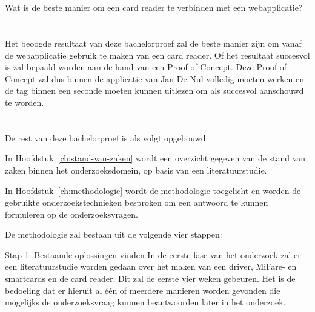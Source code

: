 \section{}%
\label{sec:onderzoeksvraag}
Wat is de beste manier om een card reader te verbinden met een webapplicatie?

\section{}%
\label{sec:onderzoeksdoelstelling}
Het beoogde resultaat van deze bachelorproef zal de beste manier zijn om vanaf de webapplicatie gebruik te maken van een card reader. Of het resultaat succesvol is zal bepaald worden aan de hand van een Proof of Concept. Deze Proof of Concept zal dus binnen de applicatie van Jan De Nul volledig moeten werken en de tag binnen een seconde moeten kunnen uitlezen om als succesvol aanschouwd te worden.


\section{}%
\label{sec:opzet-bachelorproef}


De rest van deze bachelorproef is als volgt opgebouwd:

In Hoofdstuk~\ref{ch:stand-van-zaken} wordt een overzicht gegeven van de stand van zaken binnen het onderzoeksdomein, op basis van een literatuurstudie.

In Hoofdstuk~\ref{ch:methodologie} wordt de methodologie toegelicht en worden de gebruikte onderzoekstechnieken besproken om een antwoord te kunnen formuleren op de onderzoeksvragen.

De methodologie zal bestaan uit de volgende vier stappen:

Stap 1: Bestaande oplossingen vinden
In de eerste fase van het onderzoek zal er een literatuurstudie worden gedaan over het maken van een driver, MiFare- en smartcards en de card reader. Dit zal de eerste vier weken gebeuren. Het is de bedoeling dat er hieruit al één of meerdere manieren worden gevonden die mogelijks de onderzoeksvraag kunnen beantwoorden later in het onderzoek.

